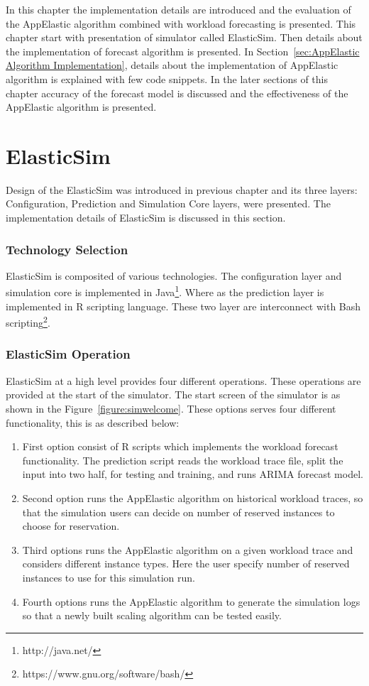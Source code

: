 In this chapter the implementation details are introduced and the evaluation of the AppElastic algorithm combined with workload forecasting is presented. This chapter start with presentation of simulator called ElasticSim. Then details about the implementation of forecast algorithm is presented. In Section~\ref{sec:AppElastic Algorithm Implementation}, details about the implementation of AppElastic algorithm is explained with few code snippets. In the later sections of this chapter accuracy of the forecast model is discussed and the effectiveness of the AppElastic algorithm is presented.

\section{ElasticSim}
\label{section:ElasticSim}
Design of the ElasticSim was introduced in previous chapter and its three layers: Configuration, Prediction and Simulation Core layers, were presented. The implementation details of ElasticSim is discussed in this section.

\subsubsection{Technology Selection}
\label{subs:Technology Selection}
ElasticSim is composited of various technologies. The configuration layer and simulation core is implemented in Java\footnote{http://java.net/}. Where as the prediction layer is implemented in R scripting language\cite{rstat}. These two layer are interconnect with Bash scripting\footnote{https://www.gnu.org/software/bash/}.

\subsubsection{ElasticSim Operation}
\label{subs:ElasticSim Operation}
ElasticSim at a high level provides four different operations. These operations are provided at the start of the simulator. The start screen of the simulator is as shown in the Figure~\ref{figure:simwelcome}. These options serves four different functionality, this is as described below:

\begin{enumerate}
  \item First option consist of R scripts which implements the workload forecast functionality. The prediction script reads the workload trace file, split the input into two half, for testing and training, and runs ARIMA forecast model.
  \item Second option runs the AppElastic algorithm on historical workload traces, so that the simulation users can decide on number of reserved instances to choose for reservation.
  \item Third options runs the AppElastic algorithm on a given workload trace and considers different instance types. Here the user specify number of reserved instances to use for this simulation run.
  \item Fourth options runs the AppElastic algorithm to generate the simulation logs so that a newly built scaling algorithm can be tested easily.
\end{enumerate}

